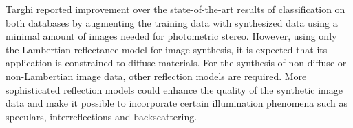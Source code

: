 Targhi reported improvement over the state-of-the-art results of classification on both databases by augmenting the training data with synthesized data using a minimal amount of images needed for photometric stereo. However, using only the Lambertian reflectance model for image synthesis, it is expected that its application is constrained to diffuse materials. For the synthesis of non-diffuse or non-Lambertian image data, other reflection models are required. More sophisticated reflection models could enhance the quality of the synthetic image data and make it possible to incorporate certain illumination phenomena such as speculars, interreflections and backscattering. 

